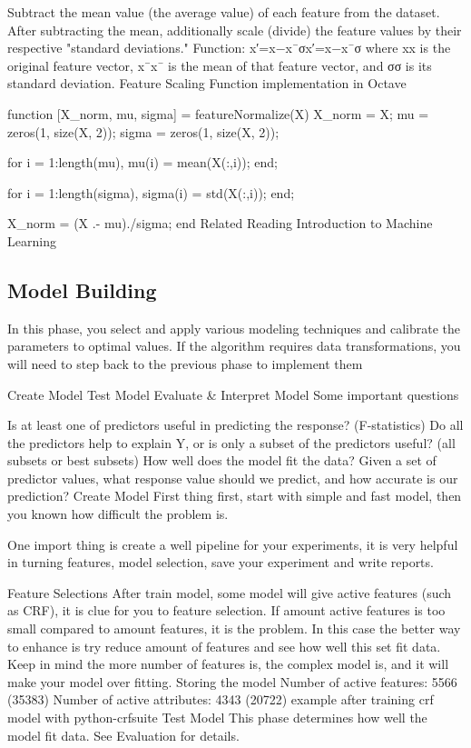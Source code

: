 Subtract the mean value (the average value) of each feature from the dataset.
After subtracting the mean, additionally scale (divide) the feature values by their respective "standard deviations."
Function: x′=x−x¯σx′=x−x¯σ where xx is the original feature vector, x¯x¯ is the mean of that feature vector, and σσ is its standard deviation.
Feature Scaling Function implementation in Octave

function [X_norm, mu, sigma] = featureNormalize(X)
X_norm = X;
mu = zeros(1, size(X, 2)); %
sigma = zeros(1, size(X, 2)); %

for i = 1:length(mu),
mu(i) = mean(X(:,i));
end;

for i = 1:length(sigma),
sigma(i) = std(X(:,i));
end;

X_norm = (X .- mu)./sigma;
end
Related Reading
Introduction to Machine Learning

\subsection{Model Building}

In this phase, you select and apply various modeling techniques and calibrate the parameters to optimal values. If the algorithm requires data transformations, you will need to step back to the previous phase to implement them

Create Model
Test Model
Evaluate & Interpret Model
Some important questions

Is at least one of predictors useful in predicting the response? (F-statistics)
Do all the predictors help to explain Y, or is only a subset of the predictors useful? (all subsets or best subsets)
How well does the model fit the data?
Given a set of predictor values, what response value should we predict, and how accurate is our prediction?
Create Model
First thing first, start with simple and fast model, then you known how difficult the problem is.

One import thing is create a well pipeline for your experiments, it is very helpful in turning features, model selection, save your experiment and write reports.

Feature Selections
After train model, some model will give active features (such as CRF), it is clue for you to feature selection. If amount active features is too small compared to amount features, it is the problem. In this case the better way to enhance is try reduce amount of features and see how well this set fit data. Keep in mind the more number of features is, the complex model is, and it will make your model over fitting.
Storing the model
Number of active features: 5566 (35383)
Number of active attributes: 4343 (20722)
example after training crf model with python-crfsuite
Test Model
This phase determines how well the model fit data. See Evaluation for details.

